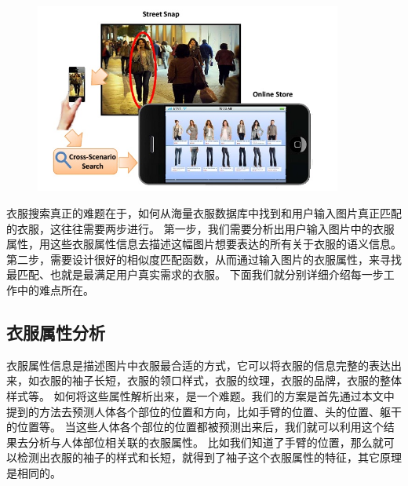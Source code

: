 \begin{figure}
\centering
\includegraphics[width=0.9\textwidth]{img/street2shop.jpg}
\label{fig:street}
\end{figure}

衣服搜索真正的难题在于，如何从海量衣服数据库中找到和用户输入图片真正匹配的衣服，这往往需要两步进行。
第一步，我们需要分析出用户输入图片中的衣服属性，用这些衣服属性信息去描述这幅图片想要表达的所有关于衣服的语义信息。
第二步，需要设计很好的相似度匹配函数，从而通过输入图片的衣服属性，来寻找最匹配、也就是最满足用户真实需求的衣服。
下面我们就分别详细介绍每一步工作中的难点所在。

\subsection{衣服属性分析}
衣服属性信息是描述图片中衣服最合适的方式，它可以将衣服的信息完整的表达出来，如衣服的袖子长短，衣服的领口样式，衣服的纹理，衣服的品牌，衣服的整体样式等。
如何将这些属性解析出来，是一个难题。我们的方案是首先通过本文中提到的方法去预测人体各个部位的位置和方向，比如手臂的位置、头的位置、躯干的位置等。
当这些人体各个部位的位置都被预测出来后，我们就可以利用这个结果去分析与人体部位相关联的衣服属性。
比如我们知道了手臂的位置，那么就可以检测出衣服的袖子的样式和长短，就得到了袖子这个衣服属性的特征，其它原理是相同的。

